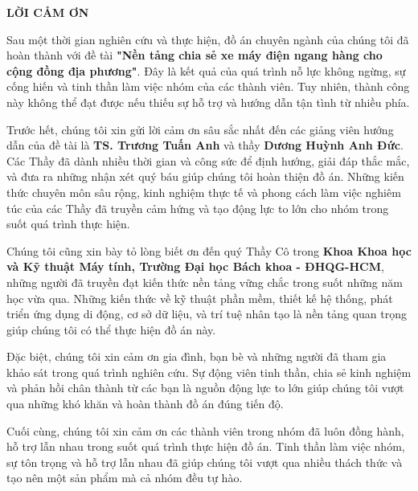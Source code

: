 

\newpage
\thispagestyle{empty}
\begin{center}
    \textbf{\Large LỜI CẢM ƠN}
\end{center}

\vspace{1cm}

Sau một thời gian nghiên cứu và thực hiện, đồ án chuyên ngành của chúng tôi đã hoàn thành với đề tài \textbf{"Nền tảng chia sẻ xe máy điện ngang hàng cho cộng đồng địa phương"}. Đây là kết quả của quá trình nỗ lực không ngừng, sự cống hiến và tinh thần làm việc nhóm của các thành viên. Tuy nhiên, thành công này không thể đạt được nếu thiếu sự hỗ trợ và hướng dẫn tận tình từ nhiều phía.

Trước hết, chúng tôi xin gửi lời cảm ơn sâu sắc nhất đến các giảng viên hướng dẫn của đề tài là \textbf{TS. Trương Tuấn Anh} và thầy \textbf{Dương Huỳnh Anh Đức}. Các Thầy đã dành nhiều thời gian và công sức để định hướng, giải đáp thắc mắc, và đưa ra những nhận xét quý báu giúp chúng tôi hoàn thiện đồ án. Những kiến thức chuyên môn sâu rộng, kinh nghiệm thực tế và phong cách làm việc nghiêm túc của các Thầy đã truyền cảm hứng và tạo động lực to lớn cho nhóm trong suốt quá trình thực hiện.


Chúng tôi cũng xin bày tỏ lòng biết ơn đến quý Thầy Cô trong \textbf{Khoa Khoa học và Kỹ thuật Máy tính, Trường Đại học Bách khoa - ĐHQG-HCM}, những người đã truyền đạt kiến thức nền tảng vững chắc trong suốt những năm học vừa qua. Những kiến thức về kỹ thuật phần mềm, thiết kế hệ thống, phát triển ứng dụng di động, cơ sở dữ liệu, và trí tuệ nhân tạo là nền tảng quan trọng giúp chúng tôi có thể thực hiện đồ án này.

Đặc biệt, chúng tôi xin cảm ơn gia đình, bạn bè và những người đã tham gia khảo sát trong quá trình nghiên cứu. Sự động viên tinh thần, chia sẻ kinh nghiệm và phản hồi chân thành từ các bạn là nguồn động lực to lớn giúp chúng tôi vượt qua những khó khăn và hoàn thành đồ án đúng tiến độ.

Cuối cùng, chúng tôi xin cảm ơn các thành viên trong nhóm đã luôn đồng hành, hỗ trợ lẫn nhau trong suốt quá trình thực hiện đồ án. Tinh thần làm việc nhóm, sự tôn trọng và hỗ trợ lẫn nhau đã giúp chúng tôi vượt qua nhiều thách thức và tạo nên một sản phẩm mà cả nhóm đều tự hào.

